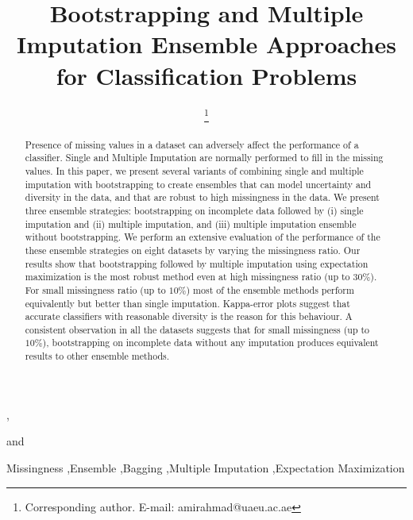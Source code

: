 \documentclass{iosart2c}
\begin{document}
\begin{frontmatter}    
\title{Bootstrapping and Multiple Imputation Ensemble Approaches for Classification Problems}

\author[A]{ },
\author[B]{ \thanks{Corresponding author. E-mail: amirahmad@uaeu.ac.ae}}
and
\author[C]{ }
\address[A]{Toronto Rehabilitation Institute, 550 University Avenue, Toronto, Canada, ON, M5G 2A2\\
E-mail: shehroz.khan@uhn.ca}
\address[B]{College of Information Technology, United Arab Emirates University, Al Ain, UAE\\
E-mail: amirahmad@uaeu.ac.ae}
\address[C]{Department of Occupational Sciences and Occupational Therapy, University of Toronto, Canada\\
E-mail: alex.mihailidis@utoronto.ca}

\begin{abstract}
Presence of missing values in a dataset can adversely affect the performance of a classifier. Single and Multiple Imputation are normally performed to fill in the missing values. In this paper, we present several variants of combining single and multiple imputation with bootstrapping to create ensembles that can model uncertainty and diversity in the data, and that are robust to high missingness in the data. We present three ensemble strategies: bootstrapping on incomplete data followed by (i) single imputation and (ii) multiple imputation, and (iii) multiple imputation ensemble without bootstrapping. We perform an extensive evaluation of the performance of the these ensemble strategies on eight datasets by varying the missingness ratio. Our results show that bootstrapping followed by multiple imputation using expectation maximization is the most robust method even at high missingness ratio (up to $30\%$). For small missingness ratio (up to $10\%$) most of the ensemble methods perform equivalently but better than single imputation. Kappa-error plots suggest that accurate classifiers with reasonable diversity is the reason for this behaviour. A consistent observation in all the datasets suggests that for small missingness (up to $10\%$), bootstrapping on incomplete data without any imputation produces equivalent results to other ensemble methods. 
\end{abstract}

\begin{keyword}
Missingness \sep Ensemble \sep Bagging \sep Multiple Imputation \sep Expectation Maximization
\end{keyword}

\end{frontmatter}
\end{document}
